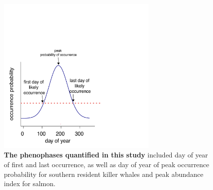 \documentclass{article}
\begin{document}
\begin{figure}[ht]
\includegraphics[width=0.7\textwidth]{../analyses/figures/phenophases.pdf}
\caption{\textbf{The phenophases quantified in this study} included day of year of first and last occurrence, as well as day of year of peak occurrence probability for southern resident killer whales and peak abundance index for salmon.}
\label{fig:ctcalb}
\end{figure}

\vspace*{\floatsep}
\end{document}

